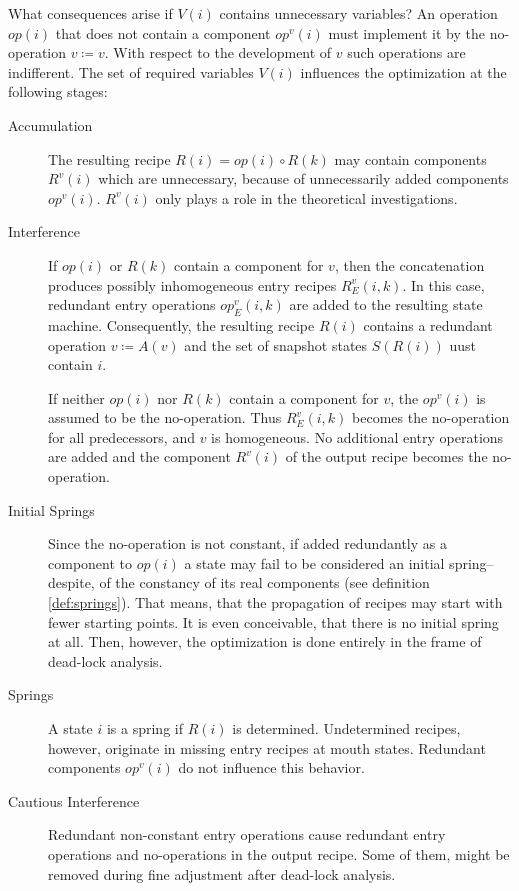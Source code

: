 \documentclass[12pt,a4paper]{scrartcl}
\begin{document}
What consequences arise if $V(i)$ contains unnecessary variables?  An operation
$op(i)$ that does not contain a component $op^v(i)$ must implement it by the
no-operation $v\coloneqq v$. With respect to the development of $v$ such
operations are indifferent. The set of required variables $V(i)$ influences the
optimization at the following stages:

\begin{description}
\item [Accumulation]

    The resulting recipe $R(i) = op(i)\circ R(k)$ may contain components
    $R^v(i)$ which are unnecessary, because of unnecessarily added components
    $op^v(i)$. $R^v(i)$ only plays a role in the theoretical investigations.

\item [Interference]

    If $op(i)$ or $R(k)$ contain a component for $v$, then the concatenation
    produces possibly inhomogeneous entry recipes $R^v_E(i,k)$.  In this case,
    redundant entry operations $op_E^v(i,k)$ are added to the resulting state
    machine. Consequently, the resulting recipe $R(i)$ contains a redundant
    operation $v\coloneqq A(v)$ and the set of snapshot states $S(R(i))$ uust
    contain $i$.

    If neither $op(i)$ nor $R(k)$ contain a component for $v$, the $op^v(i)$ is
    assumed to be the no-operation. Thus $R_E^v(i,k)$ becomes the no-operation
    for all predecessors, and $v$ is homogeneous. No additional entry
    operations are added and the component $R^v(i)$ of the output recipe
    becomes the no-operation.

\item [Initial Springs]

    Since the no-operation is not constant, if added redundantly as a component
    to $op(i)$ a state may fail to be considered an initial spring--despite, of
    the constancy of its real components (see definition \ref{def:springs}).
    That means, that the propagation of recipes may start with fewer starting
    points. It is even conceivable, that there is no initial spring at all.
    Then, however, the optimization is done entirely in the frame of dead-lock
    analysis.

\item [Springs]

    A state $i$ is a spring if $R(i)$ is determined. Undetermined recipes,
    however, originate in missing entry recipes at mouth states. Redundant
    components $op^v(i)$ do not influence this behavior.

\item [Cautious Interference]

    Redundant non-constant entry operations cause redundant entry operations
    and no-operations in the output recipe. Some of them, might be removed
    during fine adjustment after dead-lock analysis.

\end{description}
\end{document}
